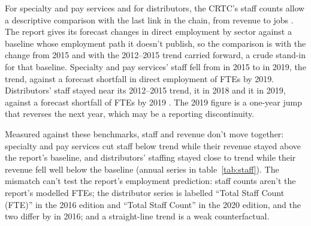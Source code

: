 For specialty and pay services and for distributors, the CRTC's staff counts allow a descriptive comparison with the last link in the chain, from revenue to jobs \citep{crtc2017sfs2016, crtc2021sfs2020}. The report gives its forecast changes in direct employment by sector against a baseline whose employment path it doesn't publish, so the comparison is with the change from 2015 and with the 2012--2015 trend carried forward, a crude stand-in for that baseline. Specialty and pay services' staff fell from \lttvStaffChanFifteen{} in 2015 to \lttvStaffChanNineteen{} in 2019, \lttvStaffChanVsTrend{} \lttvStaffChanVsTrendDir{} the trend, against a forecast shortfall in direct employment of \lttvStaffChanForecast{} FTEs by 2019. Distributors' staff stayed near its 2012--2015 trend, \lttvStaffDistVsTrendEighteen{} \lttvStaffDistVsTrendEighteenDir{} it in 2018 and \lttvStaffDistVsTrend{} \lttvStaffDistVsTrendDir{} it in 2019, against a forecast shortfall of \lttvStaffDistForecast{} FTEs by 2019 \citep[Table~22, p.~91]{nordicity2015television}. The 2019 figure is a one-year jump that reverses the next year, which may be a reporting discontinuity.

Measured against these benchmarks, staff and revenue don't move together: specialty and pay services cut staff below trend while their revenue stayed above the report's baseline, and distributors' staffing stayed close to trend while their revenue fell well below the baseline (annual series in table~\ref{tab:staff}). The mismatch can't test the report's employment prediction: staff counts aren't the report's modelled FTEs; the distributor series is labelled \enquote{Total Staff Count (FTE)} in the 2016 edition and \enquote{Total Staff Count} in the 2020 edition, and the two differ by \lttvStaffDistVintageGap{} in 2016; and a straight-line trend is a weak counterfactual.
